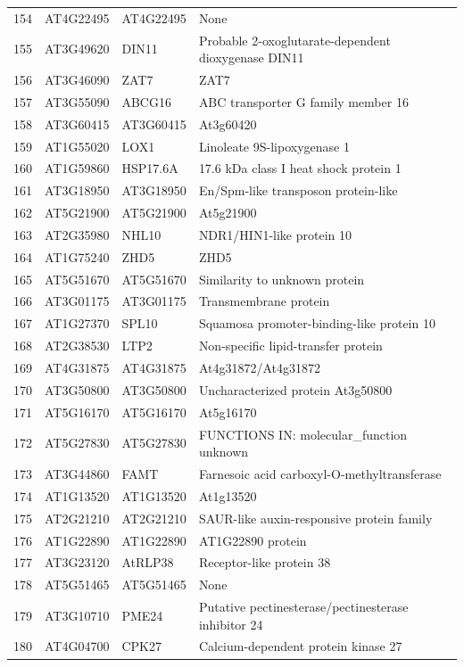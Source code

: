 \documentclass[11pt]{article}
\begin{document}
\begin{center}
\begin{tabular}{rlll}
154 & AT4G22495 & AT4G22495 & None\\
155 & AT3G49620 & DIN11 & Probable 2-oxoglutarate-dependent dioxygenase DIN11\\
156 & AT3G46090 & ZAT7 & ZAT7\\
157 & AT3G55090 & ABCG16 & ABC transporter G family member 16\\
158 & AT3G60415 & AT3G60415 & At3g60420\\
159 & AT1G55020 & LOX1 & Linoleate 9S-lipoxygenase 1\\
160 & AT1G59860 & HSP17.6A & 17.6 kDa class I heat shock protein 1\\
161 & AT3G18950 & AT3G18950 & En/Spm-like transposon protein-like\\
162 & AT5G21900 & AT5G21900 & At5g21900\\
163 & AT2G35980 & NHL10 & NDR1/HIN1-like protein 10\\
164 & AT1G75240 & ZHD5 & ZHD5\\
165 & AT5G51670 & AT5G51670 & Similarity to unknown protein\\
166 & AT3G01175 & AT3G01175 & Transmembrane protein\\
167 & AT1G27370 & SPL10 & Squamosa promoter-binding-like protein 10\\
168 & AT2G38530 & LTP2 & Non-specific lipid-transfer protein\\
169 & AT4G31875 & AT4G31875 & At4g31872/At4g31872\\
170 & AT3G50800 & AT3G50800 & Uncharacterized protein At3g50800\\
171 & AT5G16170 & AT5G16170 & At5g16170\\
172 & AT5G27830 & AT5G27830 & FUNCTIONS IN: molecular\_function unknown\\
173 & AT3G44860 & FAMT & Farnesoic acid carboxyl-O-methyltransferase\\
174 & AT1G13520 & AT1G13520 & At1g13520\\
175 & AT2G21210 & AT2G21210 & SAUR-like auxin-responsive protein family\\
176 & AT1G22890 & AT1G22890 & AT1G22890 protein\\
177 & AT3G23120 & AtRLP38 & Receptor-like protein 38\\
178 & AT5G51465 & AT5G51465 & None\\
179 & AT3G10710 & PME24 & Putative pectinesterase/pectinesterase inhibitor 24\\
180 & AT4G04700 & CPK27 & Calcium-dependent protein kinase 27\\

\end{tabular}
\end{center}
\end{document}
